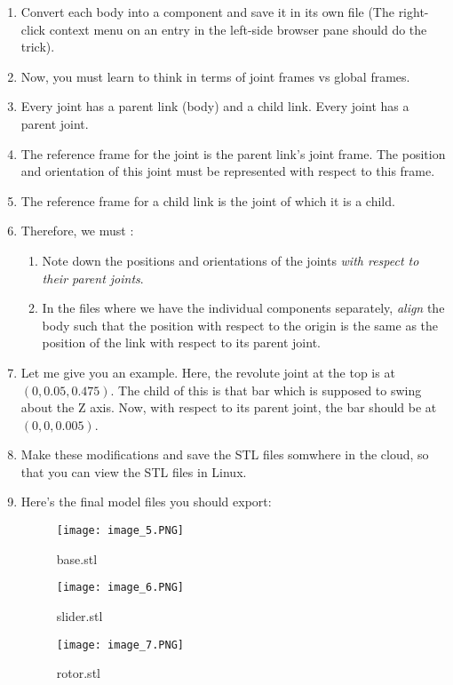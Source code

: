 \documentclass{article}
\begin{document}
\begin{enumerate}
                \item Convert each body into a component and save it in its own file (The right-click context menu 
                on an entry in the left-side browser pane should do the trick).
                \item Now, you must learn to think in terms of joint frames vs global frames.
                \item Every joint has a parent link (body) and a child link. Every joint has a parent joint.
                \item The reference frame for the joint is the parent link's joint frame. The position 
                and orientation of this joint must be represented with respect to this frame.
                \item The reference frame for a child link is the joint of which it is a child.
                \item Therefore, we must :
                \begin{enumerate}
                    \item Note down the positions and orientations of the joints \emph{with respect to their parent joints}.
                    \item In the files where we have the individual components separately, \emph{align} the body such
                    that the position with respect to the origin is the same as the position of the link with 
                    respect to its parent joint.
                \end{enumerate}
                \item Let me give you an example. Here, the revolute joint at the top is at $(0, 0.05, 0.475)$.
                The child of this is that bar which is supposed to swing about the Z axis. Now, with respect to
                its parent joint, the bar should be at $(0, 0, 0.005)$.
                \item Make these modifications and save the STL files somwhere in the cloud, so that you 
                can view the STL files in Linux.
                \item Here's the final model files you should export:
                \begin{figure}[H]
                    \center
                    \texttt{[image: image\_5.PNG]}
                    \caption{base.stl}
                \end{figure}
                \begin{figure}[H]
                    \center
                    \texttt{[image: image\_6.PNG]}
                    \caption{slider.stl}
                \end{figure}
                \begin{figure}[H]
                    \center
                    \texttt{[image: image\_7.PNG]}
                    \caption{rotor.stl}
                \end{figure}
            \end{enumerate}
\end{document}
